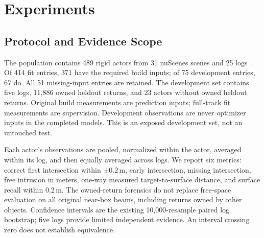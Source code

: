 \section{Experiments}
\label{sec:experiments}
\subsection{Protocol and Evidence Scope}
The population contains 489 rigid actors from 31 nuScenes scenes and 25 logs~\cite{nuscenes}. Of 414 fit entries, 371 have the required build inputs; of 75 development entries, 67 do. All 51 missing-input entries are retained. The development set contains five logs, 11,886 owned heldout returns, and 23 actors without owned heldout returns. Original build measurements are prediction inputs; full-track fit measurements are supervision. Development observations are never optimizer inputs in the completed models. This is an exposed development set, not an untouched test.

Each actor's observations are pooled, normalized within the actor, averaged within its log, and then equally averaged across logs. We report six metrics: correct first intersection within $\pm0.2$\,m, early intersection, missing intersection, free intrusion in meters, one-way measured target-to-surface distance, and surface recall within 0.2\,m. The owned-return forensics do not replace free-space evaluation on all original near-box beams, including returns owned by other objects. Confidence intervals are the existing 10,000-resample paired log bootstrap; five logs provide limited independent evidence. An interval crossing zero does not establish equivalence.

\begin{table}[t]
 \centering\small
 \caption{Completed development results from canonical saved summaries. Hit, early, missing and recall are percentages; free intrusion and distance are meters. Rows span different model and adaptation protocols and are not all single-factor ablations. Directed distance is conditional on available/evaluable surfaces; empty cases remain in coverage and ray accounting. Native fusion can produce surfaces for five additional zero-LiDAR development entries, so conditional distance is not an unconditional comparison. r7/r6 is the final pathway comparison described in the text.}
 \label{tab:main}
\end{table}

